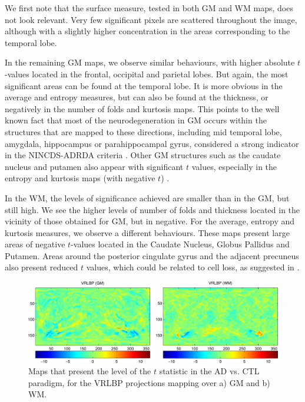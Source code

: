 We first note that the surface measure, tested in both \ac{GM} and \ac{WM} maps, does not look relevant. Very few significant pixels are scattered throughout the image, although with a slightly higher concentration in the areas corresponding to the temporal lobe. 

In the remaining \ac{GM} maps, we observe similar behaviours, with higher absolute $t$-values located in the frontal, occipital and parietal lobes. But again, the most significant areas can be found at the temporal lobe. It is more obvious in the average and entropy measures, but can also be found at the thickness, or negatively in the number of folds and kurtosis maps. This points to the well known fact that most of the neurodegeneration in \ac{GM} occurs within the structures that are mapped to these directions, including mid temporal lobe, amygdala, hippocampus or parahippocampal gyrus, considered a strong indicator in the NINCDS-ADRDA criteria \cite{Dubois2007}. Other \ac{GM} structures such as the caudate nucleus and putamen also appear with significant $t$ values, especially in the entropy and kurtosis maps (with negative $t$) \cite{Pievani2013}. 

In the \ac{WM}, the levels of significance achieved are smaller than in the \ac{GM}, but still high. We see the higher levels of number of folds and thickness located in the vicinity of those obtained for \ac{GM}, but in negative. For the average, entropy and kurtosis measures, we observe a different behaviours. These maps present large areas of negative $t$-values located in the Caudate Nucleus, Globus Pallidus and Putamen. Areas around the posterior cingulate gyrus and the adjacent precuneus also present reduced $t$ values, which could be related to cell loss, as suggested in \cite{Baron2001}.

\begin{figure}[htp]
	\myfloatalign
	\includegraphics[width=\textwidth]{Graphics/ch6/09-tmaps_vrlbp}
	\caption[$t$-maps for the \acs{VRLBP}-\acs{SBM} in the \acs{AD} vs \acs{CTL} scenario.]{Maps that present the level of the $t$ statistic in the \ac{AD} vs. \ac{CTL} paradigm, for the VRLBP projections mapping over a) \ac{GM} and b) \ac{WM}. }
	\label{fig:tmapvrlbp}
\end{figure}

